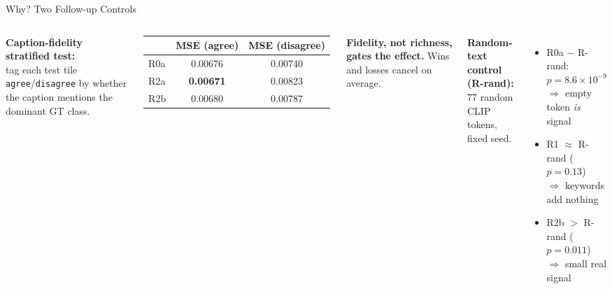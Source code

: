 \documentclass[aspectratio=169,11pt]{beamer}
\begin{document}
\begin{frame}{Why? Two Follow-up Controls}
\begin{columns}[T]
\textbf{Caption-fidelity stratified test:}\\
tag each test tile \texttt{agree}/\texttt{disagree} by whether the
caption mentions the dominant GT class.
\medskip

\small
\begin{tabular}{@{}lcc@{}}
\toprule
& MSE (agree) & MSE (disagree) \\
\midrule
R0a & 0.00676 & 0.00740 \\
R2a & \textbf{0.00671} & 0.00823 \\
R2b & 0.00680 & 0.00787 \\
\bottomrule
\end{tabular}
\medskip

\textcolor{accent}{\textbf{Fidelity, not richness, gates the effect.}}
Wins and losses cancel on average.

\textbf{Random-text control (R-rand):}\\
77 random CLIP tokens, fixed seed.
\medskip

\begin{itemize}\setlength\itemsep{2pt}\small
  \item R0a $-$ R-rand:\\ $p = 8.6\!\times\!10^{-9}$\\
        $\Rightarrow$ empty token \emph{is} signal
  \item R1 $\approx$ R-rand ($p=0.13$)\\
        $\Rightarrow$ keywords add nothing
  \item R2b $>$ R-rand ($p=0.011$)\\
        $\Rightarrow$ small real signal
\end{itemize}
\end{columns}
\end{frame}
\end{document}
